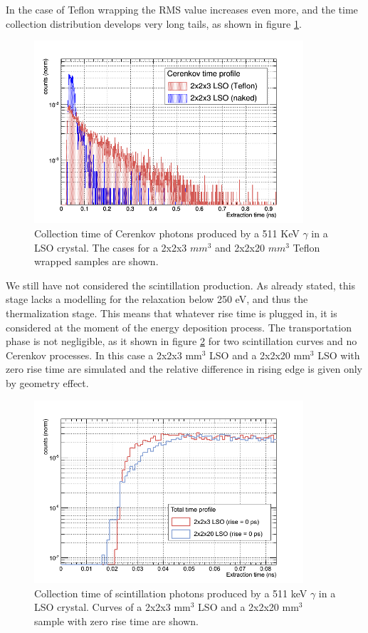 In the case of Teflon wrapping the RMS value increases even more, and the time collection distribution develops very long tails, as shown in figure \ref{fig:cer_tefl}.
\begin{figure}[htbp]
\begin{center}
\includegraphics[width=10cm]{../Pictures/Chapter_6/cerenkov_teflon_nt.png}
\end{center}
\caption[Collection Cerenkov times for LSO Teflon wrapped]{Collection time of Cerenkov photons produced by a 511 KeV $\gamma$ in a LSO crystal. The cases for a 2x2x3 $mm^{3}$ and 2x2x20 $mm^{3}$ Teflon wrapped samples are shown.}
\label{fig:cer_tefl}
\end{figure}
We still have not considered the scintillation production. As already stated, this stage lacks a modelling for the relaxation below 250 eV, and thus the thermalization stage. This means that whatever rise time is plugged in, it is considered at the moment of the energy deposition process.
The transportation phase is not negligible, as it shown in figure \ref{fig:scint_3_20} for two scintillation curves and no Cerenkov processes. In this case a 2x2x3 mm$^{3}$ LSO and a 2x2x20 mm$^{3}$ LSO with zero rise time are simulated and the relative difference in rising edge is given only by geometry effect.
\begin{figure}[htbp]
\begin{center}
\includegraphics[width=10cm]{../Pictures/Chapter_6/tot_3_20.png}
\end{center}
\caption[Collection scintillation times for LSO naked]{Collection time of scintillation photons produced by a 511 keV $\gamma$ in a LSO crystal. Curves of a 2x2x3 mm$^{3}$ LSO and a 2x2x20 mm$^{3}$ sample with zero rise time are shown.}
\label{fig:scint_3_20}
\end{figure}
